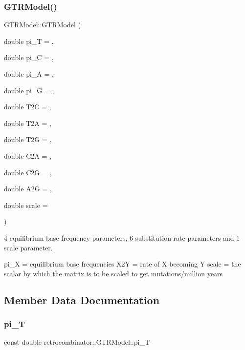 \subsubsection{\texorpdfstring{G\+T\+R\+Model()}{GTRModel()}}
{\footnotesize\ttfamily G\+T\+R\+Model\+::\+G\+T\+R\+Model (\begin{DoxyParamCaption}\item[{double}]{pi\+\_\+T = {},  }\item[{double}]{pi\+\_\+C = {},  }\item[{double}]{pi\+\_\+A = {},  }\item[{double}]{pi\+\_\+G = {},  }\item[{double}]{T2C = {},  }\item[{double}]{T2A = {},  }\item[{double}]{T2G = {},  }\item[{double}]{C2A = {},  }\item[{double}]{C2G = {},  }\item[{double}]{A2G = {},  }\item[{double}]{scale = {} }\end{DoxyParamCaption})}



4 equilibrium base frequency parameters, 6 substitution rate parameters and 1 scale parameter. 

pi\+\_\+X = equilibrium base frequencies X2Y = rate of X becoming Y scale = the scalar by which the matrix is to be scaled to get mutations/million years 

\subsection{Member Data Documentation}
\mbox{\label{classretrocombinator_1_1GTRModel_ab002dbc62f8e8fbfc94558dd94166bd8}} 
\subsubsection{\texorpdfstring{pi\+\_\+T}{pi\_T}}
{\footnotesize\ttfamily const double retrocombinator\+::\+G\+T\+R\+Model\+::pi\+\_\+T\hspace{0.3cm}{\ttfamily [protected]}}



